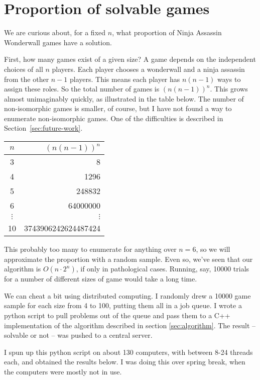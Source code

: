 \documentclass[12pt,x11names, rgb]{article}
\begin{document}
\section{Proportion of solvable games}
    \label{sec:prob}
    We are curious about, for a fixed $n$, what proportion of Ninja Assassin Wonderwall games have a solution. 

    First, how many games exist of a given size? A game depends on the independent choices of all $n$ players. Each player chooses a wonderwall and a ninja assassin from the other $n-1$ players. This means each player has $n(n-1)$ ways to assign these roles. So the total number of games is $\displaystyle \left(n(n-1)\right)^n$. This grows almost unimaginably quickly, as illustrated in the table below. The number of non-isomorphic games is smaller, of course, but I have not found a way to enumerate non-isomorphic games. One of the difficulties is described in Section~\ref{sec:future-work}.
    \begin{center}
        \begin{tabular}{c | r}
        $n$ & $\displaystyle \left(n(n-1)\right)^n$\\
        \hline
        3 & 8\\
        4 & 1296 \\
        5 & 248832 \\
        6 & 64000000\\
        $\vdots$ & $\vdots$ \\
        10 & 3743906242624487424
        \end{tabular}
    \end{center}
    This probably too many to enumerate for anything over $n=6$, so we will approximate the proportion with a random sample. Even so, we've seen that our algorithm is $O(n\cdot 2^n)$, if only in pathological cases. Running, say, 10000 trials for a number of different sizes of game would take a long time.

    We can cheat a bit using distributed computing. I randomly drew a 10000 game sample for each size from 4 to 100, putting them all in a job queue. I wrote a python script to pull problems out of the queue and pass them to a C++ implementation of the algorithm described in section \ref{sec:algorithm}. The result -- solvable or not -- was pushed to a central server. 

    I spun up this python script on about 130 computers, with between 8-24 threads each, and obtained the results below. I was doing this over spring break, when the computers were mostly not in use.
\end{document}
